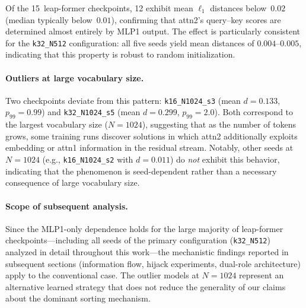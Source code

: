Of the 15~leap-former checkpoints, 12 exhibit mean $\ell_1$
distances below~$0.02$ (median typically below~$0.01$), confirming that attn2's
query--key scores are determined almost entirely by MLP1 output. The effect is
particularly consistent for the \texttt{k32\_N512} configuration: all five
seeds yield mean distances of $0.004$--$0.005$, indicating that this property
is robust to random initialization.

\paragraph{Outliers at large vocabulary size.}
Two checkpoints deviate from this pattern:
\texttt{k16\_N1024\_s3} (mean $d = 0.133$, $p_{99} = 0.99$) and
\texttt{k32\_N1024\_s5} (mean $d = 0.299$, $p_{99} = 2.0$). Both correspond
to the largest vocabulary size ($N = 1024$), suggesting that as the number of
tokens grows, some training runs discover solutions in which attn2 additionally
exploits embedding or attn1 information in the residual stream. Notably, other
seeds at $N = 1024$ (e.g., \texttt{k16\_N1024\_s2} with $d = 0.011$) do
\emph{not} exhibit this behavior, indicating that the phenomenon is
seed-dependent rather than a necessary consequence of large vocabulary size.

\paragraph{Scope of subsequent analysis.}
Since the MLP1-only dependence holds for the large majority of leap-former
checkpoints---including all seeds of the primary configuration
(\texttt{k32\_N512}) analyzed in detail throughout this work---the mechanistic
findings reported in subsequent sections (information flow, hijack experiments,
dual-role architecture) apply to the conventional case. The outlier models at
$N = 1024$ represent an alternative learned strategy that does not reduce the
generality of our claims about the dominant sorting mechanism.
